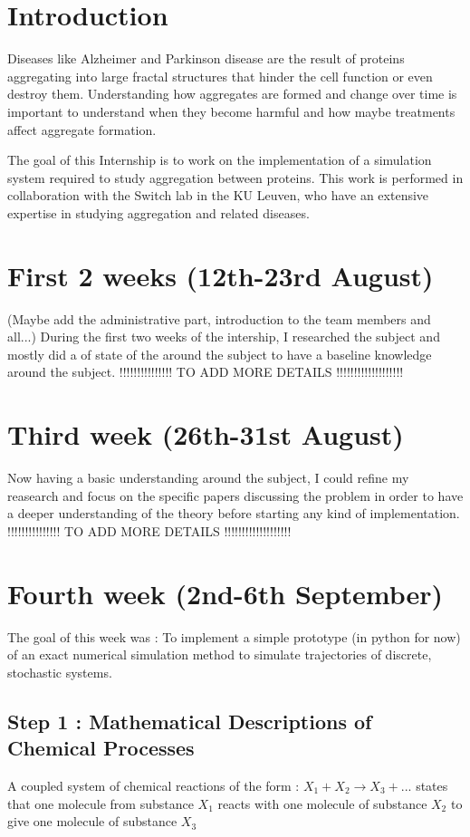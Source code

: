 \documentclass[11pt,a4paper]{article}
\begin{document}


\tableofcontents \pagebreak

\section{Introduction}
Diseases like Alzheimer and Parkinson disease are the result of proteins aggregating into large fractal structures that hinder the cell function or even destroy them. Understanding how aggregates are formed and change over time is important to understand when they become harmful and how maybe treatments affect aggregate formation.

The goal of this Internship is to work on the implementation of a simulation system required to study aggregation between proteins. This work is performed in collaboration with the Switch lab in the KU Leuven, who have an extensive expertise in studying aggregation and related diseases.

\section{First 2 weeks (12th-23rd August)}
(Maybe add the administrative part, introduction to the team members and all...)
During the first two weeks of the intership, I researched the subject and mostly did a of state of the around the subject to have a baseline knowledge around the subject. !!!!!!!!!!!!!!! TO ADD MORE DETAILS !!!!!!!!!!!!!!!!!!!

\section{Third week (26th-31st August)}
Now having a basic understanding around the subject, I could refine my reasearch and focus on the specific papers discussing the problem in order to have a
deeper understanding of the theory before starting any kind of implementation.
!!!!!!!!!!!!!!! TO ADD MORE DETAILS !!!!!!!!!!!!!!!!!!!

\section{Fourth week (2nd-6th September)}
The goal of this week was : To implement a simple prototype (in python for now) of an exact numerical simulation method to simulate trajectories of discrete, stochastic systems.

\subsection{Step 1 : Mathematical Descriptions of Chemical Processes}
A coupled system of chemical reactions of the form :
$X_{1} + X_{2} \rightarrow X_{3} + ...$ states that one molecule from substance $X_{1}$ reacts with one molecule of substance $X_{2}$ to give one molecule of substance $X_{3}$
\end{document}
